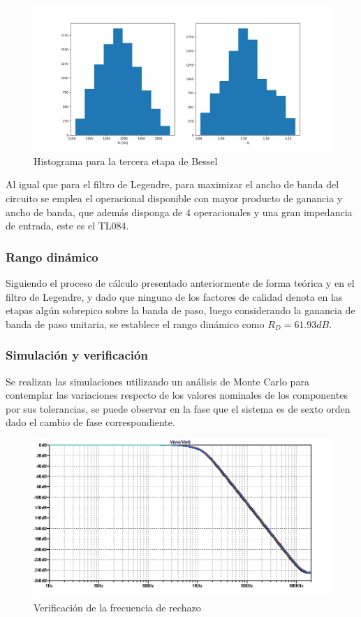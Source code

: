 \begin{figure}[H]
	\centering
	\includegraphics[scale=0.4]{../EJ1/Recursos/bessel_histogram_three.png}
	\caption{Histograma para la tercera etapa de Bessel}
	\label{fig:bessel_histogram_three}
\end{figure}

Al igual que para el filtro de Legendre, para maximizar el ancho de banda del circuito se emplea el operacional disponible con mayor producto de ganancia y ancho de banda, que adem\'as disponga de 4 operacionales y una gran impedancia de entrada, este es el TL084.

\subsubsection{Rango din\'amico}
Siguiendo el proceso de c\'alculo presentado anteriormente de forma te\'orica y en el filtro de Legendre, y dado que ninguno de los factores de calidad denota en las etapas alg\'un sobrepico sobre la banda de paso, luego
considerando la ganancia de banda de paso unitaria, se establece el rango din\'amico como $R_D = 61.93dB$.

\subsubsection{Simulaci\'on y verificaci\'on}
Se realizan las simulaciones utilizando un an\'alisis de Monte Carlo para contemplar las variaciones respecto de los valores nominales de los componentes por sus tolerancias,
se puede observar en la fase que el sistema es de sexto orden dado el cambio de fase correspondiente.

\begin{figure}[H]
	\centering
	\includegraphics[scale=0.6]{../EJ1/Recursos/bessel_verificacion_magnitud.png}
	\caption{Verificaci\'on de la frecuencia de rechazo}
\end{figure}

